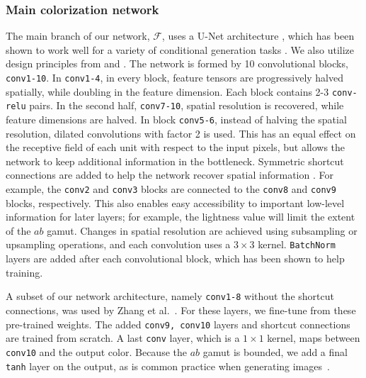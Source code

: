 \documentclass[acmtog,authorversion]{acmart}
\begin{document}
\subsubsection{Main colorization network} The main branch of our network, $\mathcal{F}$, uses a U-Net architecture \cite{ronneberger2015u}, which has been shown to work well for a variety of conditional generation tasks \cite{isola2016image}. We also utilize design principles from \cite{simonyan2014very} and \cite{yu2015multi}. The network is formed by 10 convolutional blocks, \texttt{conv1-10}. In \texttt{conv1-4}, in every block, feature tensors are progressively halved spatially, while doubling in the feature dimension. Each block contains 2-3 \texttt{conv-relu} pairs. In the second half, \texttt{conv7-10}, spatial resolution is recovered, while feature dimensions are halved. In block \texttt{conv5-6}, instead of halving the spatial resolution, dilated convolutions with factor 2 is used. This has an equal effect on the receptive field of each unit with respect to the input pixels, but allows the network to keep additional information in the bottleneck. Symmetric shortcut connections are added to help the network recover spatial information \cite{ronneberger2015u}. For example, the \texttt{conv2} and \texttt{conv3} blocks are connected to the \texttt{conv8} and \texttt{conv9} blocks, respectively. This also enables easy accessibility to important low-level information for later layers; for example, the lightness value will limit the extent of the $ab$ gamut. Changes in spatial resolution are achieved using subsampling or upsampling operations, and each convolution uses a $3\times 3$ kernel. \texttt{BatchNorm} layers are added after each convolutional block, which has been shown to help training.

A subset of our network architecture, namely \texttt{conv1-8} without the shortcut connections, was used by Zhang et al.~. For these layers, we fine-tune from these pre-trained weights. The added \texttt{conv9, conv10} layers and shortcut connections are trained from scratch. A last \texttt{conv} layer, which is a $1 \times 1$ kernel, maps between \texttt{conv10} and the output color. Because the $ab$ gamut is bounded, we add a final \texttt{tanh} layer on the output, as is common practice when generating images~\cite{goodfellow2014generative,zhu2016generative}.
\end{document}
